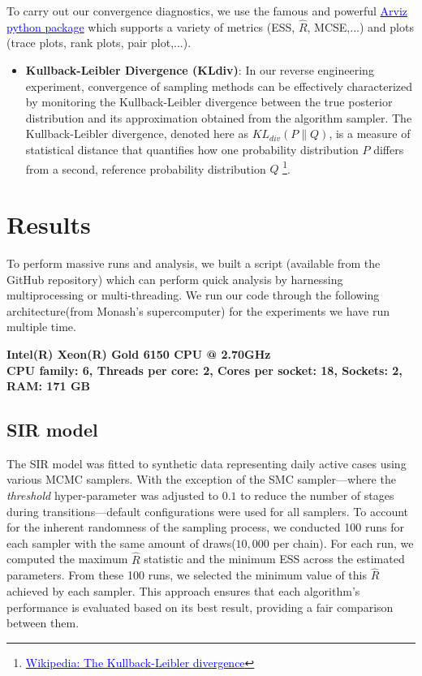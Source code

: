 \documentclass[nonatbib,preprint,12pt,authoryear]{elsarticle}
\begin{document}
To carry out our convergence diagnostics, we use the famous and powerful \href{https://python.arviz.org/en/stable/}{\textcolor{blue}{Arviz python package}} which supports a variety of metrics (ESS, $\hat{R}$, MCSE,...) and plots (trace plots, rank plots, pair plot,...).
\begin{itemize}
    \item \textbf{Kullback-Leibler Divergence (KL\textunderscore div)}: In our reverse engineering experiment, convergence of sampling methods can be effectively characterized by monitoring the Kullback-Leibler divergence between the true posterior distribution and its approximation obtained from the algorithm sampler. The Kullback-Leibler divergence, denoted here as \( KL_{div}(P \parallel Q) \), is a measure of statistical distance that quantifies how one probability distribution \( P \) differs from a second, reference probability distribution \( Q \) \footnote{\href{https://en.wikipedia.org/wiki/Kullback–Leibler_divergence}{\textcolor{blue}{Wikipedia: The Kullback-Leibler divergence}}}.
\end{itemize}
\newpage
\section{Results}
\label{sec:Results}
To perform massive runs and analysis, we built a script (available from the GitHub repository) which can perform quick analysis by harnessing multiprocessing or multi-threading. 
We run our code through the following architecture(from Monash's supercomputer) for the experiments we have run multiple time.
\begin{center}
    
\textbf{\small Intel(R) Xeon(R) Gold 6150 CPU @ 2.70GHz\\
CPU family: 6,
Threads per core: 2,
Cores per socket: 18,
Sockets: 2,
RAM: 171 GB}
\end{center}
\subsection{SIR model} 
The SIR model was fitted to synthetic data representing daily active cases using various MCMC samplers. With the exception of the SMC sampler—where the \textit{threshold} hyper-parameter was adjusted to $0.1$ to reduce the number of stages during transitions—default configurations were used for all samplers. To account for the inherent randomness of the sampling process, we conducted 100 runs for each sampler with the same amount of draws($10,000$ per chain). For each run, we computed the maximum $\hat{R}$ statistic and the minimum ESS across the estimated parameters. From these 100 runs, we selected the minimum value of this $\hat{R}$ achieved by each sampler. This approach ensures that each algorithm's performance is evaluated based on its best result, providing a fair comparison between them. 
 
\end{document}

